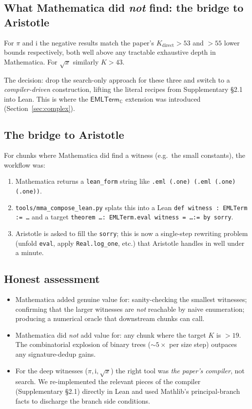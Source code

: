 \documentclass[11pt,a4paper]{article}
\theoremstyle{plain}
\theoremstyle{definition}
\newcommand{\C}{\mathbb{C}}
\newcommand{\imu}{\mathrm{i}}
\newcommand{\EMLTC}{\mathsf{EMLTerm}_\C}
\begin{document}
\subsection{What Mathematica did \emph{not} find: the bridge to Aristotle}

For $\pi$ and $\imu$ the negative results match the paper's $K_{\text{direct}}>53$
and $>55$ lower bounds respectively, both well above any tractable
exhaustive depth in Mathematica.  For $\sqrt{x}$ similarly $K>43$.

The decision: drop the search-only approach for these three and switch
to a \emph{compiler-driven} construction, lifting the literal recipes
from Supplementary §2.1 into Lean.  This is where the
$\EMLTC$ extension was introduced (Section~\ref{sec:complex}).

\subsection{The bridge to Aristotle}

For chunks where Mathematica did find a witness (e.g.~the small
constants), the workflow was:

\begin{enumerate}[leftmargin=*,nosep]
\item Mathematica returns a \texttt{lean\_form} string like
\texttt{.eml (.one) (.eml (.one) (.one))}.
\item \texttt{tools/mma\_compose\_lean.py} splats this into a Lean
\texttt{def witness : EMLTerm := \dots} and a target
\texttt{theorem \dots : EMLTerm.eval witness = \dots := by sorry}.
\item Aristotle is asked to fill the \texttt{sorry}; this is now a
single-step rewriting problem (unfold \texttt{eval}, apply
\texttt{Real.log\_one}, etc.) that Aristotle handles in well under a
minute.
\end{enumerate}

\subsection{Honest assessment}

\begin{itemize}[leftmargin=*]
\item Mathematica added genuine value for: sanity-checking the smallest
witnesses; confirming that the larger witnesses are \emph{not} reachable
by naive enumeration; producing a numerical oracle that downstream
chunks can call.
\item Mathematica did \emph{not} add value for: any chunk where the
target $K$ is $> 19$.  The combinatorial explosion of binary trees
($\sim 5\times$ per size step) outpaces any signature-dedup gains.
\item For the deep witnesses ($\pi,\imu,\sqrt{x}$) the right tool was
\emph{the paper's compiler}, not search.  We re-implemented the
relevant pieces of the compiler (Supplementary §2.1) directly in
Lean and used Mathlib's principal-branch facts to discharge the branch
side conditions.
\end{itemize}
\end{document}
